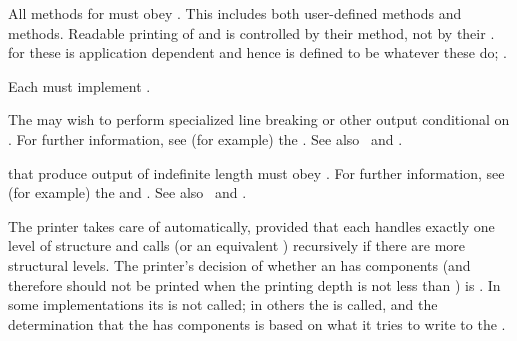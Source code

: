
\item{}

All methods for  must obey .
This includes both user-defined methods and  methods.
Readable printing of  and  
is controlled by their  method, 
not by their  .
 for these  is application dependent
and hence is defined to be whatever these  do; 
\seesection\Similarity.
 

\item{}

Each  must implement . 
 
\item{} 

The  may wish to perform specialized line breaking
or other output conditional on .
For further information,
see (for example) the  .
See also \secref\PPrintDispatchTables\ and \secref\PrettyPrinterExamples.
 
\item{}

 that produce output of indefinite length must obey
.
For further information,
see (for example) the  
and .
See also \secref\PPrintDispatchTables\ and \secref\PrettyPrinterExamples.

\item{}

The printer takes care of  automatically,
provided that each  handles exactly one level of structure and
calls  (or an equivalent ) recursively if
there are more structural levels.  The printer's decision of whether an
 has components (and therefore should not be printed when the
printing depth is not less than ) is
.  In some implementations its 
  is not called; 
in others the  is called, 
and the determination that the  has components is based on what
it tries to write to the .
     
